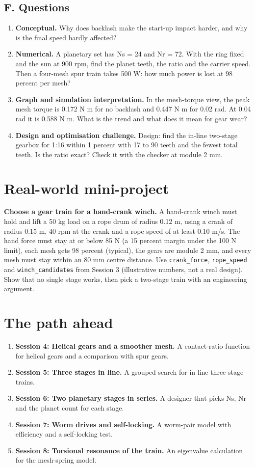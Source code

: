 \documentclass[11pt,a4paper]{article}
\begin{document}
\subsection*{F. Questions}
\begin{enumerate}[nosep]
\item \textbf{Conceptual.} Why does backlash make the start-up impact harder, and why is the final speed hardly affected?
\item \textbf{Numerical.} A planetary set has Ns = 24 and Nr = 72. With the ring fixed and the sun at 900 rpm, find the planet teeth, the ratio and the carrier speed. Then a four-mesh spur train takes 500 W: how much power is lost at 98 percent per mesh?
\item \textbf{Graph and simulation interpretation.} In the mesh-torque view, the peak mesh torque is 0.172 N m for no backlash and 0.447 N m for 0.02 rad. At 0.04 rad it is 0.588 N m. What is the trend and what does it mean for gear wear?
\item \textbf{Design and optimisation challenge.} Design: find the in-line two-stage gearbox for 1:16 within 1 percent with 17 to 90 teeth and the fewest total teeth. Is the ratio exact? Check it with the checker at module 2 mm.
\end{enumerate}

\section{Real-world mini-project}
\textbf{Choose a gear train for a hand-crank winch.} A hand-crank winch must hold and lift a 50 kg load on a rope drum of radius 0.12 m, using a crank of radius 0.15 m, 40 rpm at the crank and a rope speed of at least 0.10 m/s. The hand force must stay at or below 85 N (a 15 percent margin under the 100 N limit), each mesh gets 98 percent (typical), the gears are module 2 mm, and every mesh must stay within an 80 mm centre distance. Use \texttt{crank\_force}, \texttt{rope\_speed} and \texttt{winch\_candidates} from Session 3 (illustrative numbers, not a real design). Show that no single stage works, then pick a two-stage train with an engineering argument.

\section{The path ahead}
\begin{enumerate}[nosep]
\item \textbf{Session 4: Helical gears and a smoother mesh.} A contact-ratio function for helical gears and a comparison with spur gears.
\item \textbf{Session 5: Three stages in line.} A grouped search for in-line three-stage trains.
\item \textbf{Session 6: Two planetary stages in series.} A designer that picks Ns, Nr and the planet count for each stage.
\item \textbf{Session 7: Worm drives and self-locking.} A worm-pair model with efficiency and a self-locking test.
\item \textbf{Session 8: Torsional resonance of the train.} An eigenvalue calculation for the mesh-spring model.
\end{enumerate}
\end{document}
